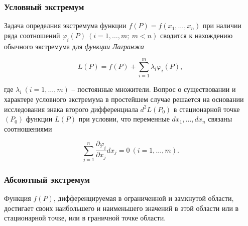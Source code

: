 	    \subsubsection*{Условный экстремум}

		    Задача определния экстремума функции $f \left( P \right) = f \left( x_{1}, \ldots, x_{n} \right)$ при наличии ряда соотношений $\varphi_{i} \left( P \right) \: \left( i = 1, \ldots, m; \: m < n \right)$ сводится к нахождению обычного экстремума для \textit{функции Лагранжа}

		    \begin{equation}
		        L \left( P \right) = f \left( P \right) + \sum^{m}_{i = 1} \lambda_{i} \varphi_{i} \left( P \right),
		    \end{equation}

		    где $\lambda_{i} \: \left( i = 1, \ldots, m \right)$ -- постоянные множители. Вопрос о существовании и характере условного экстремума в простейшем случае решается на основании исследования знака второго дифференциала $d^{2} L \left( P_{0} \right)$ в стационарной точке $\left( P_{0} \right)$ функции $L \left( P \right)$ при условии, что переменные $d x_{1}, \ldots, d x_{n}$ связаны соотношениями

		    \begin{equation}
		        \sum^{n}_{j = 1} \frac{\partial \varphi_{i}}{\partial x_{j}} d x_{j} = 0 \: \left( i = 1, \ldots, m \right).
		    \end{equation}

		\subsubsection*{Абсоютный экстремум}

			Функция $f \left( P \right)$, дифференцируемая в ограниченной и замкнутой области, достигает своих наибольшего и наименьшего значений в этой области или в стационарной точке, или в граничной точке области.


